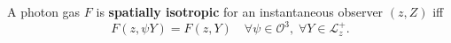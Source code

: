 A photon gas $F$ is \textbf{spatially isotropic} for an instantaneous observer $(z, Z)$ iff
$$F(z, \psi Y) = F(z, Y) \quad \forall \psi \in \mathcal{O}^3,\; \forall Y \in \mathcal{L}_z^+.$$
